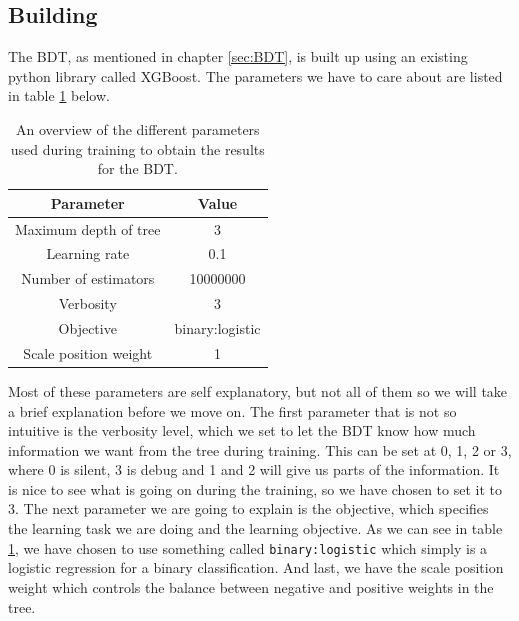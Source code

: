 \subsection{Building}
The BDT, as mentioned in chapter \ref{sec:BDT}, is built up using an existing python library called XGBoost. The parameters we have to care about are listed in table \ref{tab:parametersBDT} below. 



\begin{table}[H]
    \centering
    \renewcommand{\arraystretch}{1.}
    \begin{tabular}{c c}
    \toprule
    \textbf{Parameter} & \textbf{Value}\\
    \midrule
    \midrule
    Maximum depth of tree & 3\\
    Learning rate     & 0.1 \\
    Number of estimators     & 10000000\\
    Verbosity & 3\\
    Objective & binary:logistic\\
    Scale position weight & 1\\
    \bottomrule
    \end{tabular}
    \caption{An overview of the different parameters used during training to obtain the results for the BDT.}
    \label{tab:parametersBDT}
\end{table}

Most of these parameters are self explanatory, but not all of them so we will take a brief explanation before we move on. The first parameter that is not so intuitive is the verbosity level, which we set to let the BDT know how much information we want from the tree during training. This can be set at 0, 1, 2 or 3, where 0 is silent, 3 is debug and 1 and 2 will give us parts of the information. It is nice to see what is going on during the training, so we have chosen to set it to 3. The next parameter we are going to explain is the objective, which specifies the learning task we are doing and the learning objective. As we can see in table \ref{tab:parametersBDT}, we have chosen to use something called \texttt{binary:logistic} which simply is a logistic regression for a binary classification. And last, we have the scale position weight which controls the balance between negative and positive weights in the tree. 

